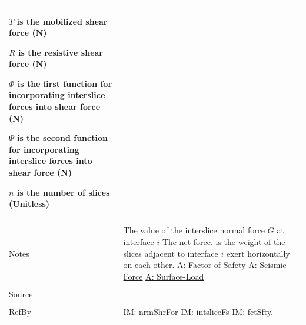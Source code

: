 \documentclass[12pt]{article}
\begin{document}
\begin{minipage}{\textwidth}
\begin{tabular}{p{} p{}}
\begin{symbDescription}
                                                                                           \item{$T$ is the mobilized shear force (N)}
                                                                                           \item{$R$ is the resistive shear force (N)}
                                                                                           \item{$Φ$ is the first function for incorporating interslice forces into shear force (N)}
                                                                                           \item{$Ψ$ is the second function for incorporating interslice forces into shear force (N)}
                                                                                           \item{$n$ is the number of slices (Unitless)}
                                                                                           \end{symbDescription}
                                                                                           \\ \midrule \\
                                                                                           Notes & The value of the interslice normal force $G$ at interface $i$ The net force. is the weight of the slices adjacent to interface $i$ exert horizontally on each other. \hyperref[A:Factor-of-Safety]{A: Factor-of-Safety} \hyperref[A:Seismic-Force]{A: Seismic-Force} \hyperref[A:Surface-Load]{A: Surface-Load}
                                                                                                   \\ \midrule \\
                                                                                                   Source & \cite{chen2005}
                                                                                                            \\ \midrule \\
                                                                                                            RefBy & \hyperref[IM:nrmShrFor]{IM: nrmShrFor} \hyperref[IM:intsliceFs]{IM: intsliceFs} \hyperref[IM:fctSfty]{IM: fctSfty}.
\\ \bottomrule \end{tabular}
\end{minipage}\\
\end{document}
